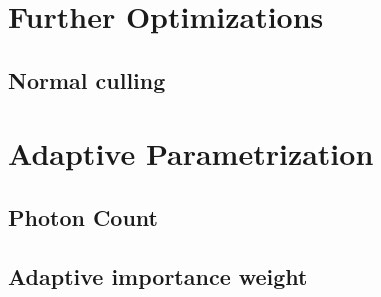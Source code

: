 \section{Further Optimizations}



\subsection{Normal culling}






\section{Adaptive Parametrization}

\subsection{Photon Count}

\subsection{Adaptive importance weight}



